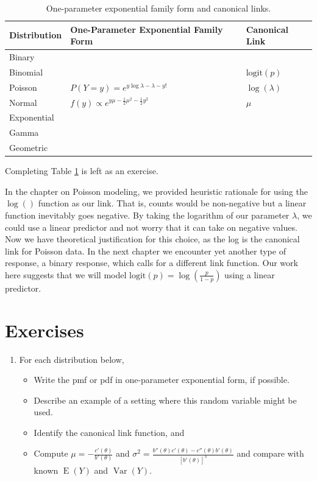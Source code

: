 \documentclass[
]{krantz}
\providecommand{\tightlist}{%
  \setlength{\itemsep}{0pt}\setlength{\parskip}{0pt}}
\newcommand{\E}{\operatorname{E}}
\newcommand{\var}{\operatorname{Var}}
\begin{document}
\begin{table}

\caption{\label{tab:table1chp5}One-parameter exponential family form and canonical links.}
\centering
\begin{tabular}[t]{lll}
\toprule
Distribution & One-Parameter Exponential Family Form & Canonical Link\\
\midrule
Binary &  & \\
Binomial &  & $\text{logit}(p)$\\
Poisson & $P(Y=y) = e^{y\log\lambda - \lambda - y!}$ & $\log(\lambda)$\\
Normal & $f(y) \propto e^{y\mu -\frac{1}{2}\mu^2 -\frac{1}{2}y^2}$ & $\mu$\\
Exponential &  & \\
\addlinespace
Gamma &  & \\
Geometric &  & \\
\bottomrule
\end{tabular}
\end{table}

Completing Table \ref{tab:table1chp5} is left as an exercise.

In the chapter on Poisson modeling, we provided heuristic rationale for using the \(\log()\) function as our link. That is, counts would be non-negative but a linear function inevitably goes negative. By taking the logarithm of our parameter \(\lambda\), we could use a linear predictor and not worry that it can take on negative values. Now we have theoretical justification for this choice, as the log is the canonical link for Poisson data. In the next chapter we encounter yet another type of response, a binary response, which calls for a different link function. Our work here suggests that we will model \(\text{logit}(p)=\log\left(\frac{p}{1-p}\right)\) using a linear predictor.

\section{Exercises}\label{exercises-4}

\begin{enumerate}
\def\labelenumi{\arabic{enumi}.}
\item
  For each distribution below,

  \begin{itemize}
  \tightlist
  \item
    Write the pmf or pdf in one-parameter exponential form, if possible.
  \item
    Describe an example of a setting where this random variable might be used.
  \item
    Identify the canonical link function, and
  \item
    Compute \(\mu = -\frac{c'(\theta)}{b'(\theta)}\) and \(\sigma^2 = \frac{b''(\theta)c'(\theta)-c''(\theta)b'(\theta)}{[b'(\theta)]^3}\) and compare with known \(\E(Y)\) and \(\var(Y)\).
  \end{itemize}
\end{enumerate}
\end{document}
